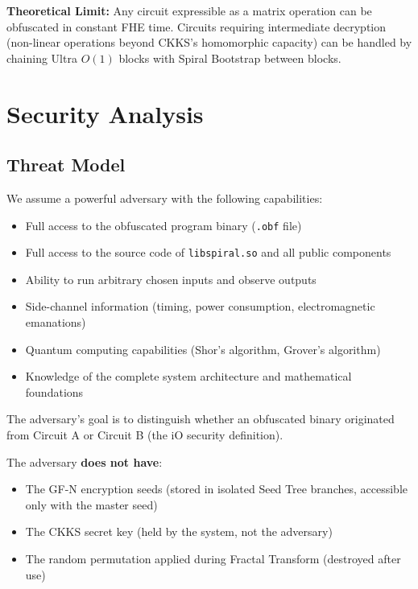 \documentclass[11pt,a4paper]{article}
\begin{document}
\textbf{Theoretical Limit:} Any circuit expressible as a matrix operation can be obfuscated in constant FHE time. Circuits requiring intermediate decryption (non-linear operations beyond CKKS's homomorphic capacity) can be handled by chaining Ultra $O(1)$ blocks with Spiral Bootstrap between blocks.

\section{Security Analysis}

\subsection{Threat Model}

We assume a powerful adversary with the following capabilities:
\begin{itemize}[nosep]
    \item Full access to the obfuscated program binary (\texttt{.obf} file)
    \item Full access to the source code of \texttt{libspiral.so} and all public components
    \item Ability to run arbitrary chosen inputs and observe outputs
    \item Side-channel information (timing, power consumption, electromagnetic emanations)
    \item Quantum computing capabilities (Shor's algorithm, Grover's algorithm)
    \item Knowledge of the complete system architecture and mathematical foundations
\end{itemize}

The adversary's goal is to distinguish whether an obfuscated binary originated from Circuit A or Circuit B (the iO security definition).

The adversary \textbf{does not have}:
\begin{itemize}[nosep]
    \item The GF-N encryption seeds (stored in isolated Seed Tree branches, accessible only with the master seed)
    \item The CKKS secret key (held by the system, not the adversary)
    \item The random permutation applied during Fractal Transform (destroyed after use)
\end{itemize}
\end{document}
